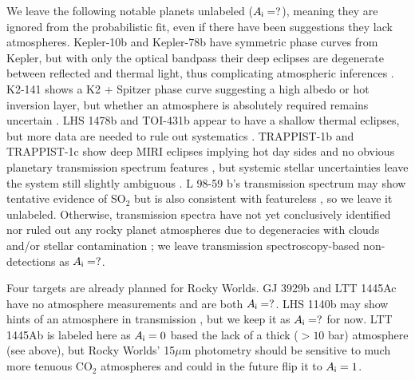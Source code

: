 \documentclass[modern,linenumbers,trackchanges]{aastex7}
\begin{document}
We leave the following notable planets unlabeled ($A_{\sf i} = ?$), meaning they are ignored from the probabilistic fit, even if there have been suggestions they lack atmospheres. 
Kepler-10b and Kepler-78b have symmetric phase curves from Kepler, but with only the optical bandpass their deep eclipses are degenerate between reflected and thermal light, thus complicating atmospheric inferences \citep{sanchis-ojedaTransitsOccultationsEarthsized2013, estevesChangingPhasesAlien2015a, huSemianalyticalModelVisiblewavelength2015, singhProbingKeplersHottest2022}. K2-141 shows a K2 + Spitzer phase curve suggesting a high albedo or hot inversion layer, but whether an atmosphere is absolutely required remains uncertain \citep{singhProbingKeplersHottest2022, ziebaK2SpitzerPhase2022}. LHS 1478b and TOI-431b appear to have a shallow thermal eclipses, but more data are needed to rule out systematics \citep{augustHotRocksSurvey2025, monaghanLow45Mm2025a}. TRAPPIST-1b and TRAPPIST-1c show deep MIRI eclipses implying hot day sides \citep{greeneThermalEmissionEarthsized2023, ihConstrainingThicknessTRAPPIST12023, ziebaNoThickCarbon2023, ducrotCombinedAnalysis1282025} and no obvious planetary transmission spectrum features \citep{limAtmosphericReconnaissanceTRAPPIST12023, radicaPromisePerilStellar2025, rathckeStellarContaminationCorrection2025}, but systemic stellar uncertainties leave the system still slightly ambiguous \citep{howardCharacterizingNearinfraredSpectra2023, rackhamRobustCorrectionsStellar2024,  fauchezStellarModelsAlso2025}.
L 98-59 b's transmission spectrum may show tentative evidence of SO$_2$ \citep[possibly from tidally-heated volcanism;][] {seligmanPotentialMeltingExtrasolar2024} but is also consistent with featureless \citep{bello-arufeEvidenceVolcanicAtmosphere2025b}, so we leave it unlabeled. Otherwise, transmission spectra have not yet conclusively identified nor ruled out any rocky planet atmospheres due to degeneracies with clouds \citep{lustig-yaegerMirageCosmicShoreline2019} and/or stellar contamination \citep{mayDoubleTroubleTwo2023, moranHighTideRiptide2023}; we leave transmission spectroscopy-based non-detections as $A_{\sf i} = ?$.

Four targets are already planned for Rocky Worlds. GJ 3929b \citep{beardGJ3929Highprecision2022, kemmerDiscoveryMassMeasurement2022} and LTT 1445Ac \citep[][]{wintersSecondPlanetTransiting2022, passHSTWFC3Light2023, laviePlanetarySystemLTT2023} have no atmosphere measurements and are both $A_{\sf i}=?$. LHS 1140b \citep{dittmannTemperateRockySuperEarth2017c, mentSecondTerrestrialPlanet2019c} may show hints of an atmosphere in transmission \citep{cadieuxTransmissionSpectroscopyHabitable2024}, but we keep it as $A_{\sf i}=?$ for now. LTT 1445Ab is labeled here as $A_{\sf i}=0$ based the lack of a thick ($>10$ bar) atmosphere (see above), but Rocky Worlds' 15$\mu$m photometry should be sensitive to much more tenuous CO$_2$ atmospheres and could in the future flip it to $A_{\sf i}=1$. 
\end{document}
